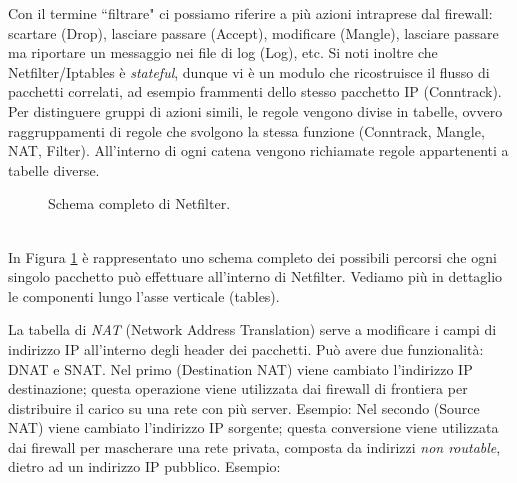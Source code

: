 Con il termine \textquotedblleft filtrare" ci possiamo riferire a più azioni intraprese dal firewall: scartare (Drop), lasciare passare (Accept), modificare (Mangle), lasciare passare ma riportare un messaggio nei file di log (Log), etc. Si noti inoltre che Netfilter/Iptables è \textit{stateful}, dunque vi è un modulo che ricostruisce il flusso di pacchetti correlati, ad esempio frammenti dello stesso pacchetto IP (Conntrack). Per distinguere gruppi di azioni simili, le regole vengono divise in tabelle, ovvero raggruppamenti di regole che svolgono la stessa funzione (Conntrack, Mangle, NAT, Filter). All'interno di ogni catena vengono richiamate regole appartenenti a tabelle diverse.
\begin{figure}
	\caption{Schema completo di Netfilter.}
	\label{img:nfk-traversal}
\end{figure}\\
In Figura \ref{img:nfk-traversal} è rappresentato uno schema completo dei possibili percorsi che ogni singolo pacchetto può effettuare all'interno di Netfilter. Vediamo più in dettaglio le componenti lungo l'asse verticale (tables).

La tabella di \textit{NAT} (Network Address Translation) serve a modificare i campi di indirizzo IP all'interno degli header dei pacchetti. Può avere due funzionalità: DNAT e SNAT. Nel primo (Destination NAT) viene cambiato l'indirizzo IP destinazione; questa operazione viene utilizzata dai firewall di frontiera per distribuire il carico su una rete con più server. Esempio:
Nel secondo (Source NAT) viene cambiato l'indirizzo IP sorgente; questa conversione viene utilizzata dai firewall per mascherare una rete privata, composta da indirizzi \textit{non routable}, dietro ad un indirizzo IP pubblico. Esempio:

